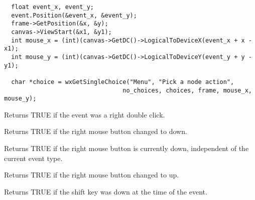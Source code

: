 \begin{verbatim}
  float event_x, event_y;
  event.Position(&event_x, &event_y);
  frame->GetPosition(&x, &y);
  canvas->ViewStart(&x1, &y1);
  int mouse_x = (int)(canvas->GetDC()->LogicalToDeviceX(event_x + x - x1);
  int mouse_y = (int)(canvas->GetDC()->LogicalToDeviceY(event_y + y - y1);

  char *choice = wxGetSingleChoice("Menu", "Pick a node action",
                                 no_choices, choices, frame, mouse_x, mouse_y);
\end{verbatim}



Returns TRUE if the event was a right double click.



Returns TRUE if the right mouse button changed to down.



Returns TRUE if the right mouse button is currently down, independent
of the current event type.



Returns TRUE if the right mouse button changed to up.




Returns TRUE if the shift key was down at the time of the event.

